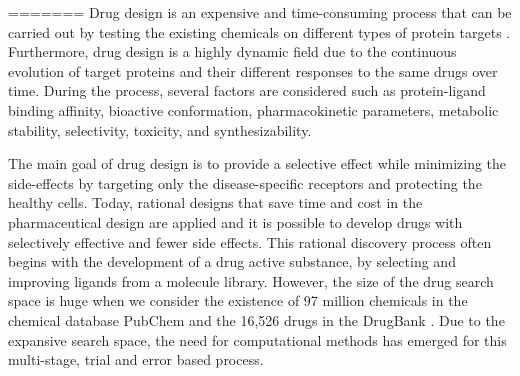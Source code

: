 


=======
\label{chapter:introduction}
Drug design is an expensive and time-consuming process that can be carried out by testing the existing chemicals on different types of protein targets \cite{csermely2013structure}. Furthermore, drug design is a highly dynamic field due to the continuous evolution of target proteins and their different responses to the same drugs over time. During the process, several factors are considered such as protein-ligand binding affinity, bioactive conformation, pharmacokinetic parameters, metabolic stability, selectivity, toxicity, and synthesizability.

The main goal of drug design is to provide a selective effect while minimizing the side-effects by targeting only the disease-specific receptors and protecting the healthy cells. Today, rational designs that save time and cost in the pharmaceutical design are applied and it is possible to develop drugs with selectively effective and fewer side effects. This rational discovery process often begins with the development of a drug active substance, by selecting and improving ligands from a molecule library. However, the size of the drug search space is huge when we consider the existence of 97 million chemicals in the chemical database PubChem \cite{bolton2008pubchem} and the 16,526 drugs in the DrugBank \cite{law2013drugbank}. Due to the expansive search space, the need for computational methods has emerged for this multi-stage, trial and error based process. 

